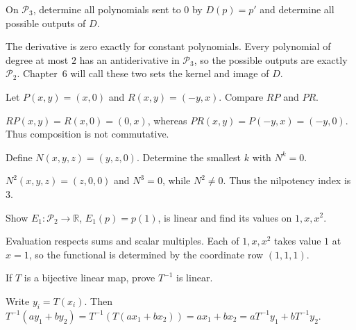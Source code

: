 \begin{problem}\label{prob:i05-problem-03}
On $\mathcal P_3$, determine all polynomials sent to $0$ by $D(p)=p'$ and determine all possible outputs of $D$.
\end{problem}
\begin{solution}
The derivative is zero exactly for constant polynomials. Every polynomial of degree at most $2$ has an antiderivative in $\mathcal P_3$, so the possible outputs are exactly $\mathcal P_2$. Chapter~6 will call these two sets the kernel and image of $D$.
\end{solution}

\begin{problem}\label{prob:i05-problem-04}
Let $P(x,y)=(x,0)$ and $R(x,y)=(-y,x)$. Compare $RP$ and $PR$.
\end{problem}
\begin{solution}
$RP(x,y)=R(x,0)=(0,x)$, whereas $PR(x,y)=P(-y,x)=(-y,0)$. Thus composition is not commutative.
\end{solution}

\begin{problem}\label{prob:i05-problem-05}
Define $N(x,y,z)=(y,z,0)$. Determine the smallest $k$ with $N^k=0$.
\end{problem}
\begin{solution}
$N^2(x,y,z)=(z,0,0)$ and $N^3=0$, while $N^2\ne0$. Thus the nilpotency index is $3$.
\end{solution}

\begin{problem}\label{prob:i05-problem-06}
Show $E_1:\mathcal P_2\to\mathbb R$, $E_1(p)=p(1)$, is linear and find its values on $1,x,x^2$.
\end{problem}
\begin{solution}
Evaluation respects sums and scalar multiples. Each of $1,x,x^2$ takes value $1$ at $x=1$, so the functional is determined by the coordinate row $(1,1,1)$.
\end{solution}

\begin{problem}\label{prob:i05-problem-07}
If $T$ is a bijective linear map, prove $T^{-1}$ is linear.
\end{problem}
\begin{solution}
Write $y_i=T(x_i)$. Then $T^{-1}(ay_1+by_2)=T^{-1}(T(ax_1+bx_2))=ax_1+bx_2=aT^{-1}y_1+bT^{-1}y_2$.
\end{solution}

